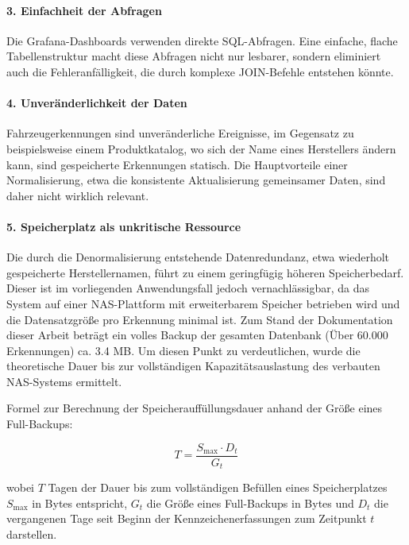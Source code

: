 \paragraph{3. Einfachheit der Abfragen}
Die Grafana-Dashboards verwenden direkte SQL-Abfragen. Eine einfache, flache Tabellenstruktur macht diese Abfragen nicht nur lesbarer, sondern eliminiert auch die Fehleranfälligkeit, die durch komplexe JOIN-Befehle entstehen könnte.

\paragraph{4. Unveränderlichkeit der Daten}
Fahrzeugerkennungen sind unveränderliche Ereignisse, im Gegensatz zu beispielsweise einem Produktkatalog, wo sich der Name eines Herstellers ändern kann, sind gespeicherte Erkennungen statisch.
Die Hauptvorteile einer Normalisierung, etwa die konsistente Aktualisierung gemeinsamer Daten, sind daher nicht wirklich relevant.

\newpage
\paragraph{5. Speicherplatz als unkritische Ressource}
Die durch die Denormalisierung entstehende Datenredundanz, etwa wiederholt gespeicherte Herstellernamen, führt zu einem geringfügig höheren Speicherbedarf.
Dieser ist im vorliegenden Anwendungsfall jedoch vernachlässigbar, da das System auf einer NAS-Plattform mit erweiterbarem Speicher betrieben wird und die Datensatzgröße pro Erkennung minimal ist.
Zum Stand der Dokumentation dieser Arbeit beträgt ein volles Backup der gesamten Datenbank (Über 60.000 Erkennungen) ca. 3.4 MB.
Um diesen Punkt zu verdeutlichen, wurde die theoretische Dauer bis zur vollständigen Kapazitätsauslastung des verbauten NAS-Systems ermittelt.

\vspace{0.5cm}
Formel zur Berechnung der Speicherauffüllungsdauer anhand der Größe eines Full-Backups:

\begin{equation}
    \label{eq:speicher}
    T = \frac{S_{\max} \cdot D_t}{G_t}
\end{equation}

wobei $T$ Tagen der Dauer bis zum vollständigen Befüllen eines Speicherplatzes $S_{\max}$ in Bytes entspricht, $G_t$ die Größe eines Full-Backups in Bytes und $D_t$ die vergangenen Tage seit Beginn der Kennzeichenerfassungen zum Zeitpunkt $t$ darstellen.

